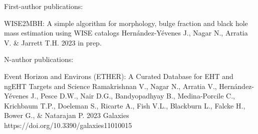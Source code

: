 
\begin{cvpublications}{First-author publications:}

	 {WISE2MBH: A simple algorithm for morphology, bulge fraction and black hole mass estimation using WISE catalogs}
	 {Hernández-Yévenes J., Nagar N., Arratia V. \& Jarrett T.H.}
	 {2023}
     {in prep.}
     {}

\end{cvpublications}

\begin{cvpublications}{N-author publications:}

	{Event Horizon and Environs (ETHER): A Curated Database for EHT and ngEHT Targets and Science}
	{Ramakrishnan V., Nagar N., Arratia V., Hernández-Yévenes J., Pesce D.W., Nair D.G., Bandyopadhyay B., Medina-Porcile C.,  Krichbaum T.P., Doeleman S., Ricarte A., Fish V.L., Blackburn L., Falcke H., Bower G., \& Natarajan P.}
    {2023}
	{Galaxies}
    {https://doi.org/10.3390/galaxies11010015}

\end{cvpublications}
